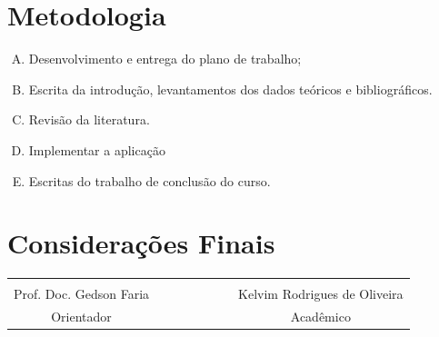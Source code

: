\documentclass[a4paper,12pt,portuguese]{ufms-cpcx}
\begin{document}
\chapter{Metodologia} \label{cap: metodologia}

\begin{enumerate}[(A)]
	
	\item Desenvolvimento e entrega do plano de trabalho;
	\item Escrita da introdução, levantamentos dos dados teóricos e bibliográficos.
	\item Revisão da literatura. 
	\item Implementar a aplicação
	\item Escritas do trabalho de conclusão do curso.		
	
	
\end{enumerate}

\chapter{Considerações Finais}


\vskip 10cm
\begin{table}[!h]
	\renewcommand{\arraystretch}{1.3}
	\centering
	\begin{tabular}{cccccccc}
		& & & & & & & \\
		Prof. Doc. Gedson Faria & & & & & & & Kelvim Rodrigues de Oliveira \\
		Orientador & & & & & & & Acadêmico \\
	\end{tabular}
\end{table}


\cleardoublepage
{} 

% 

%
\end{document}
